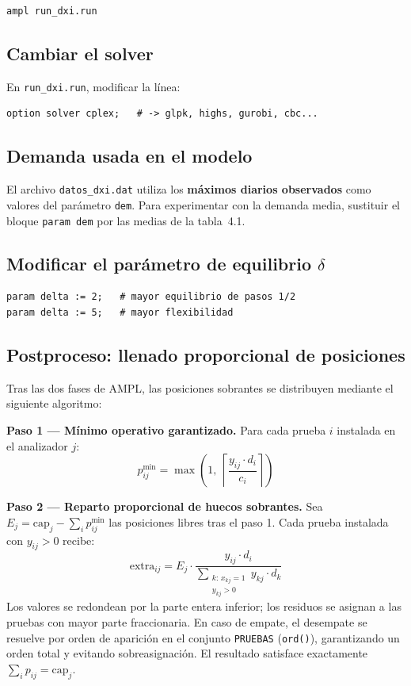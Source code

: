 \documentclass[12pt, a4paper]{article}
\begin{document}
\begin{lstlisting}[language=bash,caption={Desde terminal (línea de comandos).}]
ampl run_dxi.run
\end{lstlisting}

\subsection{Cambiar el solver}

En \texttt{run\_dxi.run}, modificar la línea:
\begin{lstlisting}[language={}]
option solver cplex;   # -> glpk, highs, gurobi, cbc...
\end{lstlisting}

\subsection{Demanda usada en el modelo}

El archivo \texttt{datos\_dxi.dat} utiliza los \textbf{máximos diarios observados} como
valores del parámetro \texttt{dem}. Para experimentar con la demanda media, sustituir el
bloque \texttt{param dem} por las medias de la tabla~4.1.

\subsection{Modificar el parámetro de equilibrio $\delta$}

\begin{lstlisting}[language={}]
param delta := 2;   # mayor equilibrio de pasos 1/2
param delta := 5;   # mayor flexibilidad
\end{lstlisting}

\subsection{Postproceso: llenado proporcional de posiciones}

Tras las dos fases de AMPL, las posiciones sobrantes se distribuyen mediante el siguiente
algoritmo:

\textbf{Paso 1 — Mínimo operativo garantizado.}
Para cada prueba $i$ instalada en el analizador $j$:
\[
  p_{ij}^{\min} = \max\!\left(1,\ \left\lceil \frac{y_{ij} \cdot d_i}{c_i} \right\rceil\right)
\]

\textbf{Paso 2 — Reparto proporcional de huecos sobrantes.}
Sea $E_j = \text{cap}_j - \sum_i p_{ij}^{\min}$ las posiciones libres tras el paso 1.
Cada prueba instalada con $y_{ij} > 0$ recibe:
\[
  \text{extra}_{ij} = E_j \cdot
  \frac{y_{ij} \cdot d_i}{\displaystyle\sum_{\substack{k:\,x_{kj}=1 \\ y_{kj}>0}} y_{kj} \cdot d_k}
\]
Los valores se redondean por la parte entera inferior; los residuos se asignan a las pruebas
con mayor parte fraccionaria. En caso de empate, el desempate se resuelve por orden de
aparición en el conjunto \texttt{PRUEBAS} (\texttt{ord()}), garantizando un orden total y
evitando sobreasignación. El resultado satisface exactamente $\sum_i p_{ij} = \text{cap}_j$.
\end{document}
